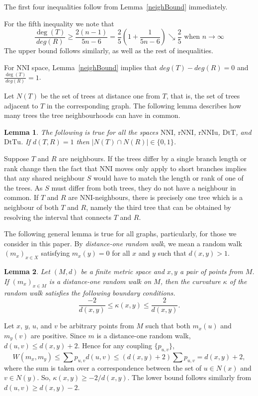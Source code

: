 \documentclass{amsart}
\newtheorem{lemma}{Lemma}
\newcommand{\nni}{\mathrm{NNI}}
\newcommand{\rnni}{\mathrm{rNNI}}
\newcommand{\rnniu}{\mathrm{rNNIu}}
\newcommand{\mdts}{\mathrm{DtT}}
\newcommand{\mdtsu}{\mathrm{DtTu}}
\begin{document}
\proof
The first four inequalities follow from Lemma~\ref{neighBound} immediately.

For the fifth inequality we note that
\[
\frac{\deg(T)}{deg(R)} \geq \frac{2(n-1)}{5n-6} = \frac25 \left(1 + \frac{1}{5n-6}\right) \searrow \frac 25 \mbox{ when } n\to\infty
\]
The upper bound follows similarly, as well as the rest of inequalities.
\endproof

For $\nni$ space, Lemma~\ref{neighBound} implies that $deg(T)-deg(R) = 0$ and $\frac{\deg(T)}{deg(R)} = 1$.

Let $N(T)$ be the set of trees at distance one from $T$, that is, the set of trees adjacent to $T$ in the corresponding graph.
The following lemma describes how many trees the tree neighbourhoods can have in common.

\begin{lemma}\label{intersecNeighb}
The following is true for all the spaces $\nni$, $\rnni$, $\rnniu$, $\mdts$, and $\mdtsu$.
If $d(T,R) = 1$ then $|N(T)\cap N(R)|\in\{0,1\}$.
\end{lemma}

\proof
Suppose $T$ and $R$ are neighbours.
If the trees differ by a single branch length or rank change then the fact that NNI moves only apply to short branches implies that any shared neighbour $S$ would have to match the length or rank of one of the trees.
As $S$ must differ from both trees, they do not have a neighbour in common.
If $T$ and $R$ are NNI-neighbours, there is precisely one tree which is a neighbour of both $T$ and $R$, namely the third tree that can be obtained by resolving the interval that connects $T$ and $R$.
\endproof

The following general lemma is true for all graphs, particularly, for those we consider in this paper.
By {\em distance-one random walk}, we mean a random walk $(m_x)_{x \in X}$ satisfying $m_x(y) = 0$ for all $x$ and $y$ such that $d(x,y) > 1$.

\begin{lemma}\label{curvBoundGeneral}
Let $(M,d)$ be a finite metric space and $x,y$ a pair of points from $M$.
If $(m_x)_{x \in M}$ is a distance-one random walk on $M$, then the curvature $\kappa$ of the random walk satisfies the following boundary conditions.
\[
\dfrac{-2}{d(x,y)} \leq \kappa(x,y) \leq \dfrac{2}{d(x,y)}.
\]
\end{lemma}

\proof
Let $x$, $y$, $u$, and $v$ be arbitrary points from $M$ such that both $m_x(u)$ and $m_y(v)$ are positive.
Since $m$ is a distance-one random walk, $d(u,v) \leq d(x,y) + 2$.
Hence for any coupling $\{p_{u,v}\}$,
\[
W(m_x,m_y) \leq \sum p_{u,v} d(u,v) \leq (d(x,y)+2)\sum p_{u,v} = d(x,y) + 2,
\]
where the sum is taken over a correspondence between the set of $u \in N(x)$ and $v \in N(y)$.
So, $\kappa(x,y) \geq - 2/d(x,y)$.
The lower bound follows similarly from $d(u,v) \geq d(x,y) - 2$.
\endproof
\end{document}
